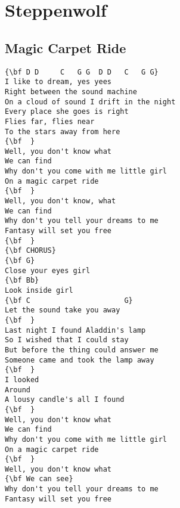 \documentclass[a4paper]{article}
\begin{document}
\section{Steppenwolf}
\subsection{Magic Carpet Ride}
\begin{multicols}{2}\begin{Verbatim}[commandchars=\\\{\}]
{\bf D D     C   G G  D D   C   G G}
I like to dream, yes yees
Right between the sound machine
On a cloud of sound I drift in the night
Every place she goes is right
Flies far, flies near
To the stars away from here
{\bf  }
Well, you don't know what
We can find
Why don't you come with me little girl
On a magic carpet ride
{\bf  }
Well, you don't know, what
We can find
Why don't you tell your dreams to me
Fantasy will set you free
{\bf  }
{\bf CHORUS}
{\bf G}
Close your eyes girl
{\bf Bb}
Look inside girl
{\bf C                      G}
Let the sound take you away
{\bf  }
Last night I found Aladdin's lamp
So I wished that I could stay
But before the thing could answer me
Someone came and took the lamp away
{\bf  }
I looked
Around
A lousy candle's all I found
{\bf  }
Well, you don't know what
We can find
Why don't you come with me little girl
On a magic carpet ride
{\bf  }
Well, you don't know what
{\bf We can see}
Why don't you tell your dreams to me
Fantasy will set you free

\end{Verbatim}
\end{multicols}\newpage
\end{document}
